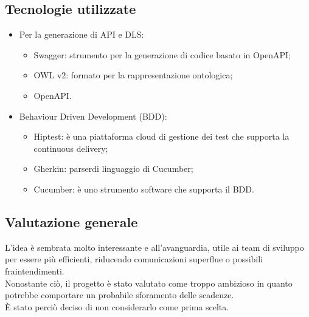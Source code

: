 \subsection{Tecnologie utilizzate}
\begin{itemize}
\item Per la generazione di API e DLS: \begin{itemize}
\item Swagger: strumento per la generazione di codice basato in OpenAPI;
\item OWL v2: formato per la rappresentazione ontologica;
\item OpenAPI.
\end{itemize}
\item Behaviour Driven Development (BDD\glo): \begin{itemize}
\item Hiptest: è una piattaforma cloud di gestione dei test che supporta la continuous delivery\glo;
\item Gherkin: parser\glo di linguaggio di Cucumber;
\item Cucumber: è uno strumento software che supporta il BDD.
\end{itemize}
\end{itemize}

\subsection{Valutazione generale}
L’idea è sembrata molto interessante e all’avanguardia, utile ai team di sviluppo per essere più efficienti, riducendo comunicazioni superflue o possibili fraintendimenti.  \\
Nonostante ciò, il progetto è stato valutato come troppo ambizioso in quanto potrebbe comportare un probabile sforamento delle scadenze.  \\
È stato perciò deciso di non considerarlo come prima scelta.




